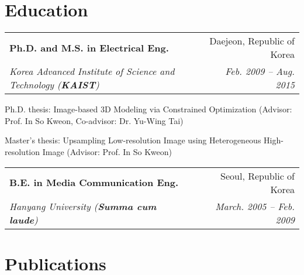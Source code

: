 \documentclass[letterpaper,11pt]{article}
\makeatletter
\newcommand{\resumeItem}[1]{
  \small{
  \item{#1 \vspace{-2pt}}
  }
}
\newcommand{\resumeSubheading}[4]{
  \vspace{-2pt}\item
    \begin{tabular*}{0.97\textwidth}[t]{l@{\extracolsep{\fill}}r}
      \textbf{#1} & #2 \\
      \textit{\small#3} & \textit{\small #4} \\
    \end{tabular*}\vspace{-7pt}
}
\newcommand{\resumeSubHeadingListStart}{\begin{itemize}[leftmargin=0.15in, label={}]}
\newcommand{\resumeSubHeadingListEnd}{\end{itemize}}
\newcommand{\resumeItemListStart}{\begin{itemize}}
\newcommand{\resumeItemListEnd}{\end{itemize}\vspace{-5pt}}
\makeatother
\begin{document}
\section{Education}
  \resumeSubHeadingListStart
    \resumeSubheading
      {Ph.D. and M.S. in Electrical Eng.}{Daejeon, Republic of Korea}
      {Korea Advanced Institute of Science and Technology \textnormal{(\textbf{KAIST})}}{Feb. 2009 -- Aug. 2015}
        \resumeItemListStart
        \resumeItem{Ph.D. thesis: Image-based 3D Modeling via Constrained Optimization (Advisor: Prof. In So Kweon, Co-advisor: Dr. Yu-Wing Tai)}
        \resumeItem{Master's thesis: Upsampling Low-resolution Image using Heterogeneous High-resolution Image (Advisor: Prof. In So Kweon)}
        \resumeItemListEnd
    \resumeSubheading
      {B.E. in Media Communication Eng.}{Seoul, Republic of Korea}
      {Hanyang University (\textbf{Summa cum laude})}{March. 2005 -- Feb. 2009}
  \resumeSubHeadingListEnd

  
\section{Publications}
\end{document}
